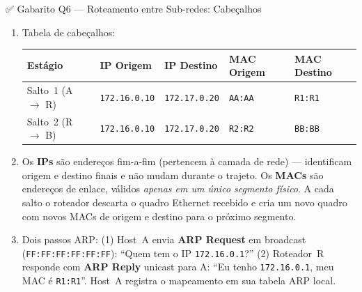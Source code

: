 \documentclass[11pt,a4paper]{article}
\begin{document}
\begin{gabaritocaixa}{✅ Gabarito Q6 --- Roteamento entre Sub-redes: Cabeçalhos}
\begin{enumerate}[label=(\alph*)]
    \item Tabela de cabeçalhos:
\begin{center}
\begin{tabularx}{\textwidth}{lXXXX}
\toprule
\textbf{Estágio} & \textbf{IP Origem} & \textbf{IP Destino} & \textbf{MAC Origem} & \textbf{MAC Destino} \\
\midrule
Salto~1 (A $\to$ R) & \texttt{172.16.0.10} & \texttt{172.17.0.20} & \texttt{AA:AA} & \texttt{R1:R1} \\
Salto~2 (R $\to$ B) & \texttt{172.16.0.10} & \texttt{172.17.0.20} & \texttt{R2:R2} & \texttt{BB:BB} \\
\bottomrule
\end{tabularx}
\end{center}
    \item Os \textbf{IPs} são endereços fim-a-fim (pertencem à camada de rede) --- identificam origem e destino finais e não mudam durante o trajeto. Os \textbf{MACs} são endereços de enlace, válidos \emph{apenas em um único segmento físico}. A cada salto o roteador descarta o quadro Ethernet recebido e cria um novo quadro com novos MACs de origem e destino para o próximo segmento.
    \item Dois passos ARP: (1) Host~A envia \textbf{ARP Request} em broadcast (\texttt{FF:FF:FF:FF:FF:FF}): ``Quem tem o IP \texttt{172.16.0.1}?'' (2) Roteador~R responde com \textbf{ARP Reply} unicast para A: ``Eu tenho \texttt{172.16.0.1}, meu MAC é \texttt{R1:R1}''. Host~A registra o mapeamento em sua tabela ARP local.
\end{enumerate}
\end{gabaritocaixa}
\end{document}
